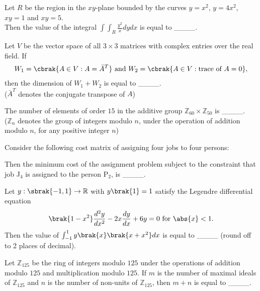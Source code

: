     \item Let $R$ be the region in the $xy$-plane bounded by the curves $y = x^2$, $y=4x^2$, $xy=1$ and $xy=5$.\\ 
            Then the value of the integral $\int \int_{R} \frac{y^2}{x} dy dx$ is equal to \_\_\_\_.

    \item Let $V$ be the vector space of all $3 \times 3$ matrices with complex entries over the real field. If
            \begin{align*}
                W_1 = \cbrak{A \in V : A = \bar{A}^T} \text{ and } W_2 = \cbrak{A \in V : \text{trace of } A = 0},
            \end{align*}
            then the dimension of $W_1 + W_2$ is equal to \_\_\_\_.\\
            ($\bar{A}^T$ denotes the conjugate transpose of $A$)

    \item The number of elements of order $15$ in the additive group $\mathbb{Z}_{60} \times \mathbb{Z}_{50}$ is \_\_\_\_. \\
            ($\mathbb{Z}_n$ denotes the group of integers modulo $n$, under the operation of addition modulo $n$, for any positive integer $n$)

    \item Consider the following cost matrix of assigning four jobs to four persons:
            \begin{table}[h!]
                \centering
                
                \caption{}
                \label{{48t}}
            \end{table}

        Then the minimum cost of the assignment problem subject to the constraint that job J$_4$ is assigned to the person P$_2$, is \_\_\_\_.
    
    \item Let $y : \sbrak{-1,1} \rightarrow \mathbb{R}$ with $y\brak{1} = 1 $ satisfy the Legendre differential equation
            \begin{align*}
                \brak{1 - x^2} \frac{d^2 y}{d x ^2} - 2 x \frac{dy}{dx} + 6y = 0 \text{ for } \abs{x} < 1.
            \end{align*}
        Then the value of $\int_{-1}^1 y \brak{x} \brak{x+x^2}dx$ is equal to \_\_\_\_ (round off to 2 places of decimal).
        
    \item Let $\mathbb{Z}_{125}$ be the ring of integers modulo $125$ under the operations of addition modulo $125$ and multiplication modulo $125$. If $m$ is the number of maximal ideals of $\mathbb{Z}_{125}$ and $n$ is the number of non-units of $\mathbb{Z}_{125}$, then $m+n$ is equal to \_\_\_\_.

